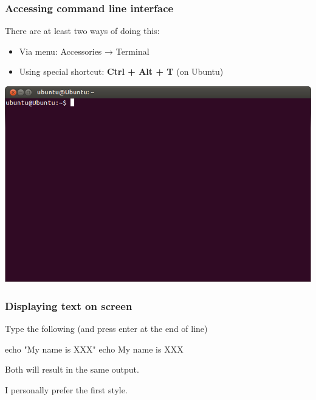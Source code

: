 \documentclass[english,11pt]{beamer}
\begin{document}
\begin{frame}
\frametitle{Accessing command line interface}

There are at least two ways of doing this:
\begin{itemize}
\item Via menu: \textsf{Accessories} →  \textsf{Terminal}
\item Using special shortcut: \textbf{Ctrl + Alt + T} (on Ubuntu)
\end{itemize}

{\centering
\includegraphics[scale=0.25]{images/terminal_ubuntu.png}
\par}

\end{frame}



\begin{frame}[fragile]
\frametitle{Displaying text on screen}

Type the following (and press enter at the end of line)
\begin{bashcode}
echo "My name is XXX"
echo My name is XXX
\end{bashcode}

Both will result in the same output.

I personally prefer the first style.
\end{frame}
\end{document}
